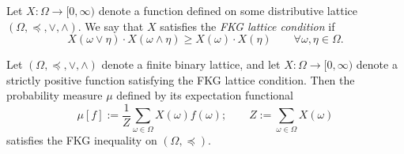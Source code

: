 \begin{definition}
    Let $X:\Omega\to[0,\infty)$ denote a
    function defined on some distributive lattice $(\Omega,\preceq,\vee,\wedge)$.
    We say that $X$ satisfies the \emph{FKG lattice condition}
    if 
    \begin{equation}
        X(\omega\vee\eta)\cdot X(\omega\wedge\eta)
        \geq
        X(\omega)\cdot X(\eta)
        \qquad
        \forall\omega,\eta\in\Omega.
    \end{equation}
\end{definition}

\begin{theorem}
    \label{thm:original_FKG}
    Let $(\Omega,\preceq,\vee,\wedge)$ denote a finite binary lattice,
    and let $X:\Omega\to[0,\infty)$ denote a strictly positive function
    satisfying the FKG lattice condition.
    Then the probability measure $\mu$ defined by its expectation functional
    \[
        \mu[f]:=\frac1Z\sum_{\omega\in\Omega}X(\omega)f(\omega);
        \qquad Z:=\sum_{\omega\in\Omega}X(\omega)
    \]
    satisfies the FKG inequality on $(\Omega,\preceq)$.
\end{theorem}

